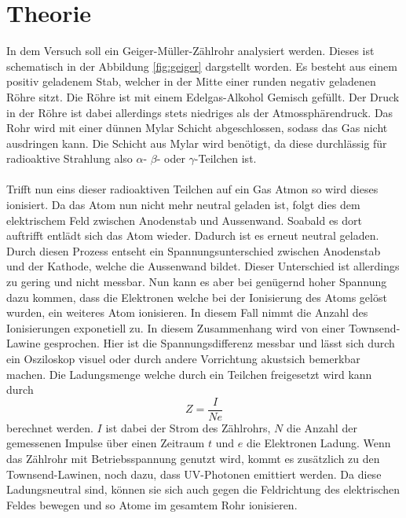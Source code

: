 \section{Theorie}
\label{sec:Theorie}

In dem Versuch soll ein Geiger-Müller-Zählrohr analysiert werden.
Dieses ist schematisch in der Abbildung \ref{fig:geiger} dargstellt worden.
Es besteht aus einem positiv geladenem Stab, welcher in der Mitte einer runden negativ geladenen Röhre sitzt. 
Die Röhre ist mit einem Edelgas-Alkohol Gemisch gefüllt.
Der Druck in der Röhre ist dabei allerdings stets niedriges als der Atmossphärendruck.
Das Rohr wird mit einer dünnen Mylar Schicht abgeschlossen, sodass das Gas nicht ausdringen kann.
Die Schicht aus Mylar wird benötigt, da diese durchlässig für radioaktive Strahlung also $\alpha$- $\beta$- oder $\gamma$-Teilchen ist.
\\\\
Trifft nun eins dieser radioaktiven Teilchen auf ein Gas Atmon so wird dieses ionisiert.
Da das Atom nun nicht mehr neutral geladen ist, folgt dies dem elektrischem Feld zwischen Anodenstab und Aussenwand.
Soabald es dort auftrifft entlädt sich das Atom wieder.
Dadurch ist es erneut neutral geladen.
Durch diesen Prozess entseht ein Spannungsunterschied zwischen Anodenstab und der Kathode, welche die Aussenwand bildet.
Dieser Unterschied ist allerdings zu gering und nicht messbar.
Nun kann es aber bei genügernd hoher Spannung dazu kommen, dass die Elektronen welche bei der Ionisierung des Atoms gelöst wurden, ein weiteres Atom ionisieren.
In diesem Fall nimmt die Anzahl des Ionisierungen exponetiell zu.
In diesem Zusammenhang wird von einer Townsend-Lawine gesprochen.
Hier ist die Spannungsdifferenz messbar und lässt sich durch ein Osziloskop visuel oder durch andere Vorrichtung akustsich bemerkbar machen.
Die Ladungsmenge welche durch ein Teilchen freigesetzt wird kann durch 
\begin{equation}
    Z = \frac{I}{Ne}
    \label{eq:z}
\end{equation}
berechnet werden.
$I$ ist dabei der Strom des Zählrohrs, $N$ die Anzahl der gemessenen Impulse über einen Zeitraum $t$ und $e$ die Elektronen Ladung.
Wenn das Zählrohr mit Betriebsspannung genutzt wird, kommt es zusätzlich zu den Townsend-Lawinen, noch dazu, dass UV-Photonen emittiert werden.
Da diese Ladungsneutral sind, können sie sich auch gegen die Feldrichtung des elektrischen Feldes bewegen und so Atome im gesamtem Rohr ionisieren.
\\\\
